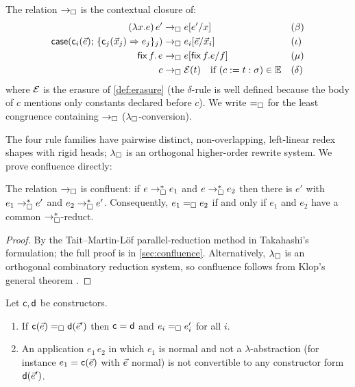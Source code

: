 \begin{definition}
\label{def:lbox-red}
The relation $\rightarrow_{\square}$ is the contextual closure of:
\begin{align*}
  (\lambda x.e)\,e' &\rightarrow_{\square} e[e'/x]
  &&(\beta)\\
  \mathsf{case}(\mathsf{c}_i(\vec{e});\, \{\mathsf{c}_j(\vec{x}_j) \Rightarrow
    e_j\}_j) &\rightarrow_{\square} e_i[\vec{e}/\vec{x}_i]
  &&(\iota)\\
  \mathsf{fix}\,f.\,e &\rightarrow_{\square} e[\mathsf{fix}\,f.e/f]
  &&(\mu)\\
  c &\rightarrow_{\square} \mathcal{E}(t) \quad \text{if } (c \mathrel{:=} t : \sigma) \in \mathbb{E}
  &&(\delta)
\end{align*}
where $\mathcal{E}$ is the erasure of \cref{def:erasure} (the $\delta$-rule is
well defined because the body of $c$ mentions only constants declared
before $c$).  We write $=_{\square}$ for the least congruence containing
$\rightarrow_{\square}$ ($\lambda_{\square}$-conversion).
\end{definition}

The four rule families have pairwise distinct, non-overlapping, left-linear
redex shapes with rigid heads; $\lambda_{\square}$ is an orthogonal higher-order
rewrite system.  We prove confluence directly:

\begin{theorem}
\label{thm:confluence}
The relation $\rightarrow_{\square}$ is confluent: if $e \rightarrow_{\square}^{*} e_1$ and $e \rightarrow_{\square}^{*} e_2$
then there is $e'$ with $e_1 \rightarrow_{\square}^{*} e'$ and $e_2 \rightarrow_{\square}^{*} e'$.
Consequently, $e_1 =_{\square} e_2$ if and only if $e_1$ and $e_2$ have a
common $\rightarrow_{\square}^{*}$-reduct.
\end{theorem}

\begin{proof}
By the Tait--Martin-L{\"o}f parallel-reduction method in Takahashi's
formulation; the full proof is in \cref{sec:confluence}.  Alternatively,
$\lambda_{\square}$ is an orthogonal combinatory reduction system, so confluence
follows from Klop's general theorem \cite{Klop1980}.
\end{proof}

\begin{corollary}
\label{cor:discrimination}
Let $\mathsf{c}, \mathsf{d}$ be constructors.
\begin{enumerate}[leftmargin=2em]
\item If $\mathsf{c}(\vec{e}) =_{\square} \mathsf{d}(\vec{e}')$ then $\mathsf{c} =
  \mathsf{d}$ and $e_i =_{\square} e'_i$ for all $i$.
\item An application $e_1\,e_2$ in which $e_1$ is normal and not a
  $\lambda$-abstraction (for instance $e_1 = \mathsf{c}(\vec{e})$ with
  $\vec{e}$ normal) is not convertible to any constructor form
  $\mathsf{d}(\vec{e}')$.
\end{enumerate}
\end{corollary}

